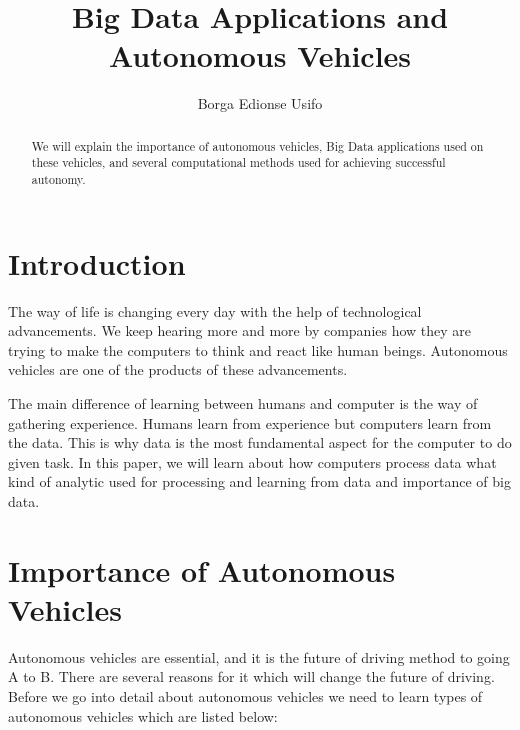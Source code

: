 \documentclass[sigconf]{acmart}
\begin{document}
\title{Big Data Applications and Autonomous Vehicles}

\author{Borga Edionse Usifo}

\renewcommand{\shortauthors}{B. Trovato et al.}

\maketitle

\begin{abstract}
We will explain the importance of autonomous vehicles, Big Data applications used on these vehicles, and several computational methods used for achieving successful autonomy. 
\end{abstract}

\section{Introduction}
The way of life is changing every day with the help of technological advancements. We keep hearing more and more by companies how they are trying to make the computers to think and react like human beings. Autonomous vehicles are one of the products of these advancements. 
\par The main difference of learning between humans and computer is the way of gathering experience. Humans learn from experience but computers learn from the data. This is why data is the most fundamental aspect for the computer to do given task. In this paper, we will learn about how computers process data what kind of analytic used for processing and learning from data and importance of big data.    



\section{Importance of Autonomous Vehicles}

Autonomous vehicles are essential, and it is the future of driving method to going A to B. There are several reasons for it which will change the future of driving. Before we go into detail about autonomous vehicles we need to learn types of autonomous vehicles which are listed below: 
\end{document}
